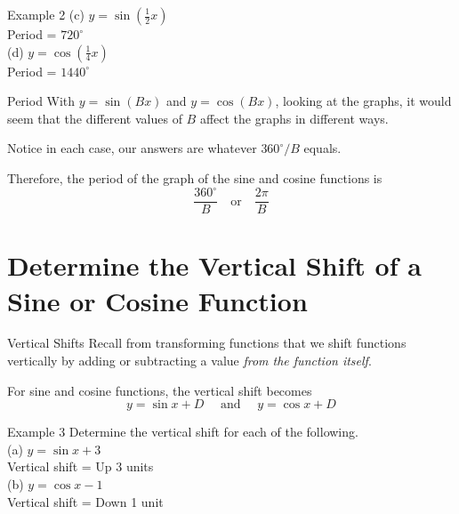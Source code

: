 \documentclass[t,usenames,dvipsnames]{beamer}
\begin{document}
\begin{frame}{Example 2}
(c) \quad $y = \sin \left(\frac{1}{2} x\right)$ \newline\\  \pause
Period = $720^\circ$    \newline\\  \pause
(d) \quad $y = \cos \left(\frac{1}{4} x\right)$ \newline\\  \pause
Period = $1440^\circ$
\end{frame}

\begin{frame}{Period}
With $y = \sin(Bx)$ and $y = \cos(Bx)$, looking at the graphs, it would seem that the different values of $B$ affect the graphs in different ways.    \newline\\  \pause 

Notice in each case, our answers are whatever $360^\circ / B$ equals. \newline\\ \pause

Therefore, the period of the graph of the sine and cosine functions is
\[
\frac{360^\circ}{B} \quad \text{or} \quad \frac{2\pi}{B}
\]
\end{frame}


\section{Determine the Vertical Shift of a Sine or Cosine Function}

\begin{frame}{Vertical Shifts}
Recall from transforming functions that we shift functions vertically by adding or subtracting a value \emph{from the function itself}.   \newline\\ \pause

For sine and cosine functions, the vertical shift becomes
\[
y = \sin x + D  \quad   \text{ and }    \quad   y = \cos x + D
\]
\end{frame}

\begin{frame}{Example 3}
Determine the vertical shift for each of the following.  \newline\\
(a) \quad $y = \sin x + 3$  \newline\\ \pause
Vertical shift = Up 3 units \newline\\ \pause
(b) \quad $y = \cos x - 1$ \newline\\ \pause
Vertical shift = Down 1 unit
\end{frame}
\end{document}

